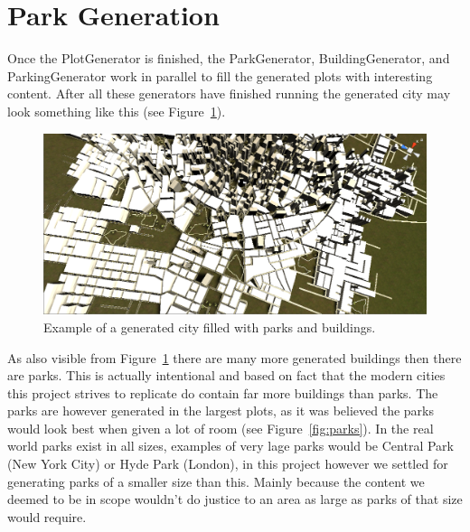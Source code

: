 \section{Park Generation}

Once the PlotGenerator is finished, the ParkGenerator, BuildingGenerator, and ParkingGenerator work in parallel to fill the generated plots with interesting content.
After all these generators have finished running the generated city may look something like this (see Figure~\ref{fig:park_ex}).

\begin{figure}
  \includegraphics[width=\linewidth]{figure/notforcingloops}
  \caption{Example of a generated city filled with parks and buildings.}
  \label{fig:park_ex}
\end{figure}

As also visible from Figure~\ref{fig:park_ex} there are many more generated buildings then there are parks. 
This is actually intentional and based on fact that the modern cities this project strives to replicate do contain far more buildings than parks. 
The parks are however generated in the largest plots, as it was believed the parks would look best when given a lot of room (see Figure~\ref{fig:parks}).
In the real world parks exist in all sizes, examples of very lage parks would be Central Park (New York City) or Hyde Park (London), in this project however we settled for generating parks of a smaller size than this. 
Mainly because the content we deemed to be in scope wouldn't do justice to an area as large as parks of that size would require. 

